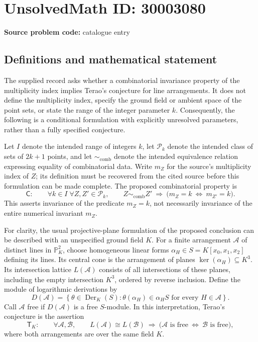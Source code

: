 \documentclass[11pt]{article}
\begin{document}
\section*{UnsolvedMath ID: 30003080}
\textbf{Source problem code:} catalogue entry
\subsection{Definitions and mathematical statement}
The supplied record asks whether a combinatorial invariance property of the multiplicity index implies Terao's conjecture for line arrangements. It does not define the multiplicity index, specify the ground field or ambient space of the point sets, or state the range of the integer parameter \(k\). Consequently, the following is a conditional formulation with explicitly unresolved parameters, rather than a fully specified conjecture.

Let \(I\) denote the intended range of integers \(k\), let \(\mathcal P_k\) denote the intended class of sets of \(2k+1\) points, and let \(\sim_{\mathrm{comb}}\) denote the intended equivalence relation expressing equality of combinatorial data. Write \(m_Z\) for the source's multiplicity index of \(Z\); its definition must be recovered from the cited source before this formulation can be made complete. The proposed combinatorial property is
\[
\mathsf C:\qquad
\forall k\in I\;\forall Z,Z'\in\mathcal P_k,\qquad
Z\sim_{\mathrm{comb}}Z'
\ \Longrightarrow\
\bigl(m_Z=k\ \Longleftrightarrow\ m_{Z'}=k\bigr).
\]
This asserts invariance of the predicate \(m_Z=k\), not necessarily invariance of the entire numerical invariant \(m_Z\).

For clarity, the usual projective-plane formulation of the proposed conclusion can be described with an unspecified ground field \(K\). For a finite arrangement \(\mathcal A\) of distinct lines in \(\mathbb P^2_K\), choose homogeneous linear forms \(\alpha_H\in S=K[x_0,x_1,x_2]\) defining its lines. Its central cone is the arrangement of planes \(\ker(\alpha_H)\subseteq K^3\). Its intersection lattice \(L(\mathcal A)\) consists of all intersections of these planes, including the empty intersection \(K^3\), ordered by reverse inclusion. Define the module of logarithmic derivations by
\[
D(\mathcal A)=
\left\{\theta\in\operatorname{Der}_K(S):
\theta(\alpha_H)\in\alpha_H S\text{ for every }H\in\mathcal A\right\}.
\]
Call \(\mathcal A\) free if \(D(\mathcal A)\) is a free \(S\)-module. In this interpretation, Terao's conjecture is the assertion
\[
\mathsf T_K:\qquad
\forall\mathcal A,\mathcal B,\qquad
L(\mathcal A)\cong L(\mathcal B)
\ \Longrightarrow\
\bigl(\mathcal A\text{ is free}\ \Longleftrightarrow\
\mathcal B\text{ is free}\bigr),
\]
where both arrangements are over the same field \(K\).
\end{document}
